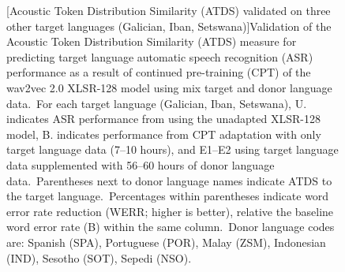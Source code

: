 \documentclass[main.tex]{subfiles}
\begin{document}
\begin{figure}[!ht]
[Acoustic Token Distribution Similarity (ATDS) validated on three other target languages (Galician, Iban, Setswana)]{Validation of the Acoustic Token Distribution Similarity (ATDS) measure for predicting target language automatic speech recognition (ASR) performance as a result of continued pre-training (CPT) of the wav2vec 2.0 XLSR-128 model using mix target and donor language data.~For each target language (Galician, Iban, Setswana), U. indicates ASR performance from using the unadapted XLSR-128 model, B. indicates performance from CPT adaptation with only target language data (7--10 hours), and E1--E2 using target language data supplemented with 56--60 hours of donor language data.~Parentheses next to donor language names indicate ATDS to the target language.~Percentages within parentheses indicate word error rate reduction (WERR; higher is better), relative the baseline word error rate (B) within the same column.~Donor language codes are: Spanish (S{\footnotesize{}PA}), Portuguese (P{\footnotesize{}OR}), Malay (Z{\footnotesize{}SM}), Indonesian (I{\footnotesize{}ND}), Sesotho (S{\footnotesize{}OT}), Sepedi (N{\footnotesize{}SO}).}
\label{tab:valid_results2}

\end{figure}


\end{document}
